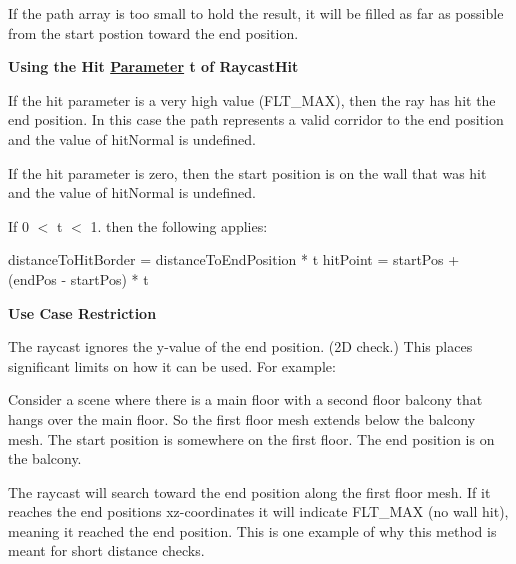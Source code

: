 If the path array is too small to hold the result, it will be filled as far as possible from the start postion toward the end position.

{\bfseries Using the Hit \hyperlink{structParameter}{Parameter} t of Raycast\+Hit}

If the hit parameter is a very high value (F\+L\+T\+\_\+\+M\+AX), then the ray has hit the end position. In this case the path represents a valid corridor to the end position and the value of {\ttfamily hit\+Normal} is undefined.

If the hit parameter is zero, then the start position is on the wall that was hit and the value of {\ttfamily hit\+Normal} is undefined.

If 0 $<$ t $<$ 1. then the following applies\+:


\begin{DoxyCode}
distanceToHitBorder = distanceToEndPosition * t
hitPoint = startPos + (endPos - startPos) * t
\end{DoxyCode}


{\bfseries Use Case Restriction}

The raycast ignores the y-\/value of the end position. (2D check.) This places significant limits on how it can be used. For example\+:

Consider a scene where there is a main floor with a second floor balcony that hangs over the main floor. So the first floor mesh extends below the balcony mesh. The start position is somewhere on the first floor. The end position is on the balcony.

The raycast will search toward the end position along the first floor mesh. If it reaches the end position\textquotesingle{}s xz-\/coordinates it will indicate F\+L\+T\+\_\+\+M\+AX (no wall hit), meaning it reached the end position. This is one example of why this method is meant for short distance checks. \mbox{\label{classdtNavMeshQuery_a96bd4282df1e863d1c813b2fe881a262}} 
